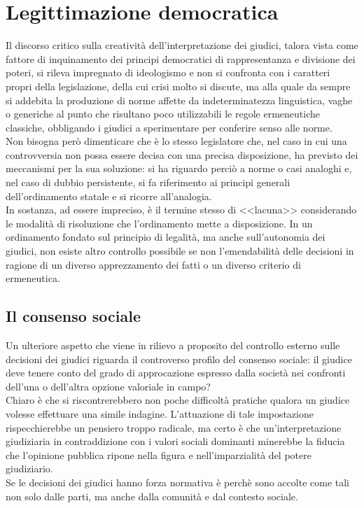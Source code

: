 \section{Legittimazione democratica} 
Il discorso critico sulla creatività dell'interpretazione dei giudici, talora vista come fattore di inquinamento dei principi democratici di rappresentanza e divisione dei poteri, si rileva impregnato di ideologismo e non si confronta con i caratteri propri della legislazione, della cui crisi molto si discute, ma alla quale da sempre si addebita la produzione di norme affette da indeterminatezza linguistica, vaghe o generiche al punto che risultano poco utilizzabili le regole ermeneutiche classiche, obbligando i giudici a sperimentare per conferire senso alle norme.
\\ Non bisogna però dimenticare che è lo stesso legislatore che, nel caso in cui una controvversia non possa essere decisa con una precisa disposizione, ha previsto dei meccanismi per la sua soluzione: si ha riguardo perciò a norme o casi analoghi e, nel caso di dubbio persistente, si fa riferimento ai principi generali dell'ordinamento statale e si ricorre all'analogia.
\\In sostanza, ad essere impreciso, è il termine stesso di <<lacuna>> considerando le modalità di risoluzione che l'ordinamento mette a disposizione.
In un ordinamento fondato sul principio di legalità, ma anche sull'autonomia dei giudici, non esiste altro controllo possibile se non l'emendabilità delle decisioni in ragione di un diverso apprezzamento dei fatti o un diverso criterio di ermeneutica.
\subsection{Il consenso sociale}
Un ulteriore aspetto che viene in rilievo a proposito del controllo esterno sulle decisioni dei giudici riguarda il controverso profilo del consenso sociale: il giudice deve tenere conto del grado di approcazione espresso dalla società nei confronti dell'una o dell'altra opzione valoriale in campo?
\\Chiaro è che si riscontrerebbero non poche difficoltà pratiche qualora un giudice volesse effettuare una simile indagine.
L'attuazione di tale impostazione rispecchierebbe un pensiero troppo radicale, ma certo è che un'interpretazione giudiziaria in contraddizione con i valori sociali dominanti minerebbe la fiducia che l'opinione pubblica ripone nella figura e nell'imparzialità del potere giudiziario.
\\Se le decisioni dei giudici hanno forza normativa è perchè sono accolte come tali non solo dalle parti, ma anche dalla comunità e dal contesto sociale.

